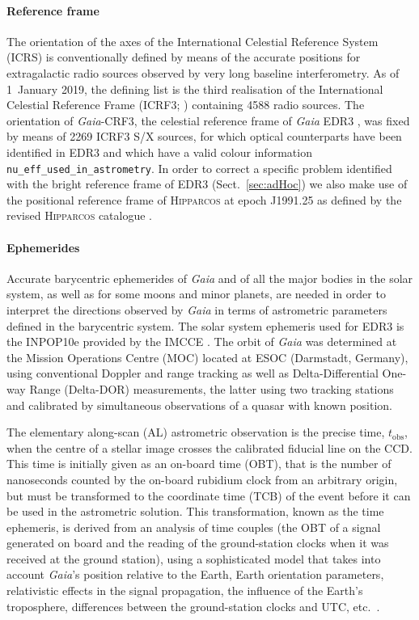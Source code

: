 \documentclass[longauth]{aa} %
\newcommand{\gacs}[1]{{\footnotesize\texttt{#1}}}
\begin{document}
\paragraph{Reference frame} The orientation of the axes of the International Celestial Reference System 
(ICRS) is conventionally defined by means of the accurate positions for extragalactic radio sources observed
by very long baseline interferometry. As of 1~January 2019, the defining list is the third realisation of 
the International Celestial Reference Frame (ICRF3; ) containing 4588
radio sources. The orientation of \textit{Gaia}-CRF3, the celestial reference frame of \textit{Gaia} EDR3
\citep{EDR3-DPACP-133}, was fixed by means of 2269 ICRF3 S/X sources, for which optical counterparts have 
been identified in EDR3 and which have a valid colour information \gacs{nu\_eff\_used\_in\_astrometry}.
In order to correct a specific problem identified with the bright reference frame of EDR3 
(Sect.~\ref{sec:adHoc}) we also make use of the positional reference frame of \textsc{Hipparcos} at 
epoch J1991.25 as defined by the revised \textsc{Hipparcos} catalogue .  

\paragraph{Ephemerides} Accurate barycentric ephemerides of \textit{Gaia} and of all the major bodies 
in the solar system, as well as for some moons and minor planets, are needed in order to interpret the
directions observed by \textit{Gaia} in terms of astrometric parameters defined in the 
barycentric system. The solar system ephemeris used for EDR3 
is the INPOP10e provided by the IMCCE . 
The orbit of \textit{Gaia} was determined at the Mission Operations Centre (MOC)
located at ESOC (Darmstadt, Germany), using conventional Doppler and range tracking 
as well as Delta-Differential One-way Range (Delta-DOR) measurements, the latter
using two tracking stations and calibrated by simultaneous observations of a quasar 
with known position.

The elementary along-scan (AL) astrometric observation is the precise time, 
$t_\text{obs}$, when the centre of a
stellar image crosses the calibrated fiducial line on the CCD. This time is initially given as an on-board
time (OBT), that is the number of nanoseconds counted by the on-board rubidium clock from an arbitrary 
origin, but must be transformed to the coordinate time (TCB) of the event before it can be used in the
astrometric solution. This transformation, known as the time ephemeris, is derived from an analysis of 
time couples (the OBT of a signal generated on board and the reading of the ground-station clocks
when it was received at the ground station), using a sophisticated model that takes into account \textit{Gaia}'s position relative to the Earth, Earth orientation parameters, relativistic effects in the signal propagation,
the influence of the Earth's troposphere, differences between the ground-station clocks and UTC,  
etc.\ . 
\end{document}
